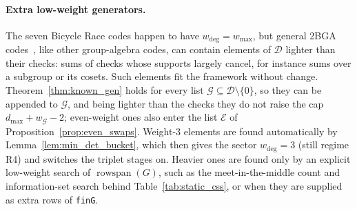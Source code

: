 \documentclass[12pt]{article}
\theoremstyle{definition}
\newcommand{\Dc}{\mathcal{D}}
\newcommand{\Gc}{\mathcal{G}}
\newcommand{\ttt}[1]{\texttt{#1}}
\begin{document}
\paragraph{Extra low-weight generators.}
The seven Bicycle Race codes happen to have $w_{\deg} = w_{\max}$, but general 2BGA codes~\cite{LinPryadko2024}, like
other group-algebra codes, can contain elements of $\Dc$ lighter than their checks: sums of checks whose supports
largely cancel, for instance sums over a subgroup or its cosets. Such elements fit the framework without change.
Theorem~\ref{thm:known_gen} holds for every list $\Gc \subseteq \Dc \setminus \{0\}$, so they can be appended to
$\Gc$, and being lighter than the checks they do not raise the cap $d_{\max} + w_{\Gc} - 2$; even-weight ones also
enter the list $\mathcal{E}$ of Proposition~\ref{prop:even_swaps}. Weight-3 elements are found automatically by
Lemma~\ref{lem:min_det_bucket}, which then gives the sector $w_{\deg} = 3$ (still regime R4) and switches the triplet
stages on. Heavier ones are found only by an explicit low-weight search of $\operatorname{rowspan}(G)$, such as the
meet-in-the-middle count and information-set search behind Table~\ref{tab:static_css}, or when they are supplied as
extra rows of \ttt{finG}.
\end{document}
